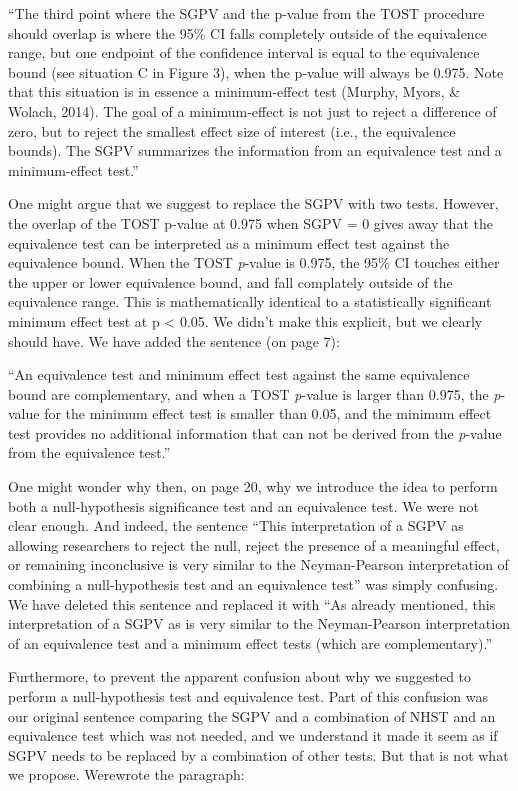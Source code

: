 \documentclass[man]{apa6}
\begin{document}
\enquote{The third point where the SGPV and the p-value from the TOST procedure should overlap is where the 95\% CI falls completely outside of the equivalence range, but one endpoint of the confidence interval is equal to the equivalence bound (see situation C in Figure 3), when the p-value will always be 0.975. Note that this
situation is in essence a minimum-effect test (Murphy, Myors, \& Wolach, 2014). The goal of a minimum-effect is not just to reject a difference of zero, but to reject the smallest effect size of interest (i.e., the equivalence bounds). The SGPV summarizes the information from an equivalence test and a minimum-effect test.}

One might argue that we suggest to replace the SGPV with two tests. However, the overlap of the TOST p-value at 0.975 when SGPV = 0 gives away that the equivalence test can be interpreted as a minimum effect test against the equivalence bound. When the TOST \emph{p}-value is 0.975, the 95\% CI touches either the upper or lower equivalence bound, and fall complately outside of the equivalence range. This is mathematically identical to a statistically significant minimum effect test at p \textless{} 0.05. We didn't make this explicit, but we clearly should have. We have added the sentence (on page 7):

\enquote{An equivalence test and minimum effect test against the same equivalence bound are complementary, and when a TOST \emph{p}-value is larger than 0.975, the \emph{p}-value for the minimum effect test is smaller than 0.05, and the minimum effect test provides no additional information that can not be derived from the \emph{p}-value from the equivalence test.}

One might wonder why then, on page 20, why we introduce the idea to perform both a null-hypothesis significance test and an equivalence test. We were not clear enough. And indeed, the sentence \enquote{This interpretation of a SGPV as allowing researchers to reject the null, reject the presence of a meaningful effect, or remaining inconclusive is very similar to the Neyman-Pearson interpretation of combining a null-hypothesis test and an equivalence test} was simply confusing. We have deleted this sentence and replaced it with \enquote{As already mentioned, this interpretation of a SGPV as is very similar to the Neyman-Pearson interpretation of an equivalence test and a minimum effect tests (which are complementary).}

Furthermore, to prevent the apparent confusion about why we suggested to perform a null-hypothesis test and equivalence test. Part of this confusion was our original sentence comparing the SGPV and a combination of NHST and an equivalence test which was not needed, and we understand it made it seem as if SGPV needs to be replaced by a combination of other tests. But that is not what we propose. Werewrote the paragraph:
\end{document}
